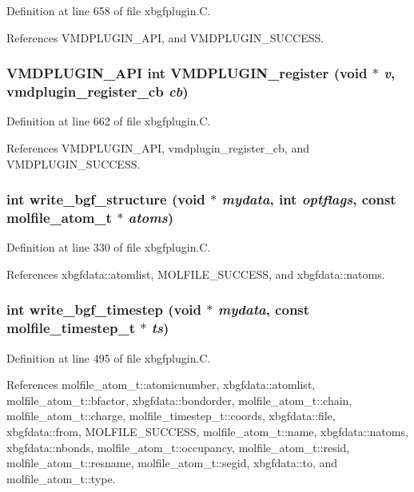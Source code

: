 Definition at line 658 of file xbgfplugin.C.

References VMDPLUGIN\_\-API, and VMDPLUGIN\_\-SUCCESS.
\subsubsection{\setlength{\rightskip}{0pt plus 5cm}VMDPLUGIN\_\-API int VMDPLUGIN\_\-register (void $\ast$ {\em v}, {\bf vmdplugin\_\-register\_\-cb} {\em cb})}\label{xbgfplugin_8C_a18}




Definition at line 662 of file xbgfplugin.C.

References VMDPLUGIN\_\-API, vmdplugin\_\-register\_\-cb, and VMDPLUGIN\_\-SUCCESS.
\subsubsection{\setlength{\rightskip}{0pt plus 5cm}int write\_\-bgf\_\-structure (void $\ast$ {\em mydata}, int {\em optflags}, const {\bf molfile\_\-atom\_\-t} $\ast$ {\em atoms})\hspace{0.3cm}{\tt  [static]}}\label{xbgfplugin_8C_a9}




Definition at line 330 of file xbgfplugin.C.

References xbgfdata::atomlist, MOLFILE\_\-SUCCESS, and xbgfdata::natoms.
\subsubsection{\setlength{\rightskip}{0pt plus 5cm}int write\_\-bgf\_\-timestep (void $\ast$ {\em mydata}, const {\bf molfile\_\-timestep\_\-t} $\ast$ {\em ts})\hspace{0.3cm}{\tt  [static]}}\label{xbgfplugin_8C_a12}




Definition at line 495 of file xbgfplugin.C.

References molfile\_\-atom\_\-t::atomicnumber, xbgfdata::atomlist, molfile\_\-atom\_\-t::bfactor, xbgfdata::bondorder, molfile\_\-atom\_\-t::chain, molfile\_\-atom\_\-t::charge, molfile\_\-timestep\_\-t::coords, xbgfdata::file, xbgfdata::from, MOLFILE\_\-SUCCESS, molfile\_\-atom\_\-t::name, xbgfdata::natoms, xbgfdata::nbonds, molfile\_\-atom\_\-t::occupancy, molfile\_\-atom\_\-t::resid, molfile\_\-atom\_\-t::resname, molfile\_\-atom\_\-t::segid, xbgfdata::to, and molfile\_\-atom\_\-t::type.
